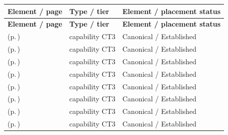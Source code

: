 \begingroup\small\setlength{\TableWidth}{\dimexpr\linewidth-6\tabcolsep-4\arrayrulewidth\relax}
\begin{longtable}{|>{\raggedright\arraybackslash}p{0.52\TableWidth}|>{\raggedright\arraybackslash}p{0.2\TableWidth}|>{\raggedright\arraybackslash}p{0.28\TableWidth}|}
\hline\rowcolor{TableHead}\textbf{Element / page} & \textbf{Type / tier} & \textbf{Element / placement status}\\\hline\endfirsthead
\hline\rowcolor{TableHead}\textbf{Element / page} & \textbf{Type / tier} & \textbf{Element / placement status}\\\hline\endhead
\hline\endfoot
\nameref{cap:bc-identity-assurance} (p.\,\pageref{cap:bc-identity-assurance}) & capability CT3 & Canonical / Established\\\hline
\nameref{cap:bc-identity-modelling-interoperability} (p.\,\pageref{cap:bc-identity-modelling-interoperability}) & capability CT3 & Canonical / Established\\\hline
\nameref{cap:bc-identity-qualification-control} (p.\,\pageref{cap:bc-identity-qualification-control}) & capability CT3 & Canonical / Established\\\hline
\nameref{cap:bc-identity-identification-authentication} (p.\,\pageref{cap:bc-identity-identification-authentication}) & capability CT3 & Canonical / Established\\\hline
\nameref{cap:bc-access-control-context-management} (p.\,\pageref{cap:bc-access-control-context-management}) & capability CT3 & Canonical / Established\\\hline
\nameref{cap:bc-access-control-assurance-reporting} (p.\,\pageref{cap:bc-access-control-assurance-reporting}) & capability CT3 & Canonical / Established\\\hline
\nameref{cap:bc-access-control-collaboration} (p.\,\pageref{cap:bc-access-control-collaboration}) & capability CT3 & Canonical / Established\\\hline
\nameref{cap:bc-access-control-enforcement} (p.\,\pageref{cap:bc-access-control-enforcement}) & capability CT3 & Canonical / Established\\\hline
\end{longtable}\endgroup

